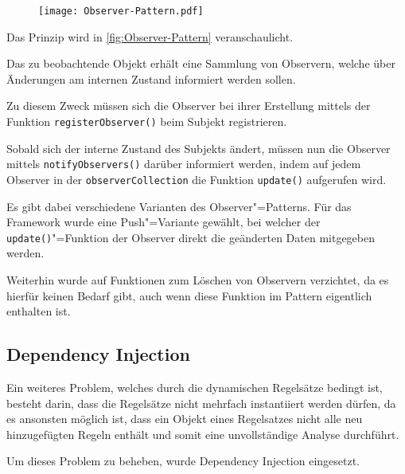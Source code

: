             \begin{figure}[htp]
                \centering%
                \texttt{[image: Observer-Pattern.pdf]}
                \label{fig:Observer-Pattern}
            \end{figure}

            Das Prinzip wird in
            \vref{fig:Observer-Pattern} veranschaulicht.

            Das zu beobachtende Objekt erhält eine Sammlung von Observern,
            welche über Änderungen am internen Zustand informiert werden sollen.

            Zu diesem Zweck müssen sich die Observer bei ihrer Erstellung mittels der Funktion
            \lstinline{registerObserver()} beim Subjekt registrieren.

            Sobald sich der interne Zustand des Subjekts ändert,
            müssen nun die Observer mittels
            \lstinline{notifyObservers()} darüber informiert werden,
            indem auf jedem Observer in der
            \lstinline{observerCollection} die Funktion
            \lstinline{update()} aufgerufen wird.

            Es gibt dabei verschiedene Varianten des Observer"=Patterns.
            Für das Framework wurde eine Push"=Variante gewählt,
            bei welcher der
            \lstinline{update()}"=Funktion der Observer direkt die geänderten Daten mitgegeben werden.

            Weiterhin wurde auf Funktionen zum Löschen von Observern verzichtet,
            da es hierfür keinen Bedarf gibt,
            auch wenn diese Funktion im Pattern eigentlich enthalten ist.

        \subsection{Dependency Injection}
            Ein weiteres Problem,
            welches durch die dynamischen Regelsätze bedingt ist,
            besteht darin,
            dass die Regelsätze nicht mehrfach instantiiert werden dürfen,
            da es ansonsten möglich ist,
            dass ein Objekt eines Regelsatzes nicht alle neu hinzugefügten Regeln enthält und
            somit eine unvollständige Analyse durchführt.

            Um dieses Problem zu beheben,
            wurde Dependency Injection eingesetzt.

